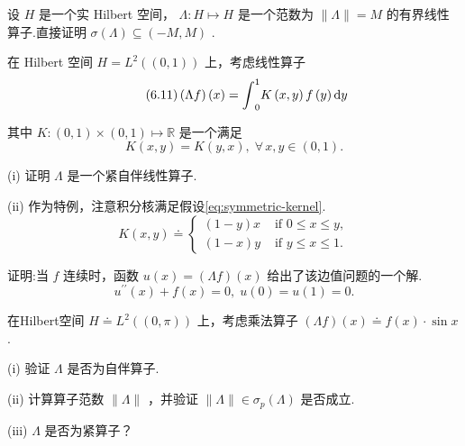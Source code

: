 \begin{rbhw}
设 $H$ 是一个实 Hilbert 空间， $\Lambda  : H \mapsto  H$ 是一个范数为 $\| \Lambda \|  = M$ 的有界线性算子.直接证明 $\sigma \left( \Lambda \right)  \subseteq  \left(  {-M,M}\right)$ .
\end{rbhw}

\begin{rbhw}
在 Hilbert 空间 $H = {L}^{2}\left( \left(  {0,1}\right)  \right)$ 上，考虑线性算子
\begin{equation}\tag{6.11}\label{eq:integral-operator-kernel}
\left( {\Lambda f}\right) \left( x\right)  = {\int }_{0}^{1}K\left( {x,y}\right) f\left( y\right) {\mathop{}\!\mathrm{d} y}
\end{equation}

其中 $K : \left(  {0,1}\right)   \times  \left(  {0,1}\right)   \mapsto  \mathbb{R}$ 是一个满足
\begin{equation}\tag{6.12}\label{eq:symmetric-kernel}
K\left( {x,y}\right)  = K\left( {y,x}\right) ,\;\forall\,x,y \in  \left(  {0,1}\right)  .
\end{equation}

(i) 证明 $\Lambda$ 是一个紧自伴线性算子.

(ii) 作为特例，注意积分核满足假设\eqref{eq:symmetric-kernel}.
\[
K\left( {x,y}\right)  \doteq  \left\{  \begin{array}{ll} \left( {1 - y}\right) x & \text{ if }0 \leq  x \leq  y, \\  \left( {1 - x}\right) y & \text{ if }y \leq  x \leq  1. \end{array}\right.
\]

证明:当 $f$ 连续时，函数 $u\left( x\right)  = \left( {\Lambda f}\right) \left( x\right)$ 给出了该边值问题的一个解.
\[
{u}^{\prime \prime }\left( x\right)  + f\left( x\right)  = 0,\;u\left( 0\right)  = u\left( 1\right)  = 0.
\]

\end{rbhw}

\begin{rbhw}
在Hilbert空间 $H \doteq  {L}^{2}\left( \left(  {0,\pi }\right)  \right)$ 上，考虑乘法算子 $\left( {\Lambda f}\right) \left( x\right)  \doteq  f\left( x\right)  \cdot  \sin x$ .

(i) 验证 $\Lambda$ 是否为自伴算子.

(ii) 计算算子范数 $\| \Lambda \|$ ，并验证 $\| \Lambda \|  \in  {\sigma }_{p}\left( \Lambda \right)$ 是否成立.

(iii) $\Lambda$ 是否为紧算子？
\end{rbhw}

